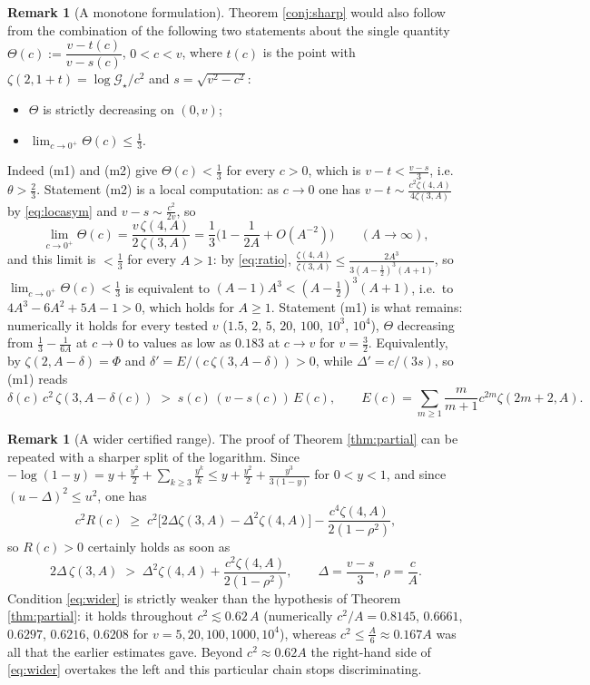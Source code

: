 \documentclass[11pt,a4paper]{amsart}
\theoremstyle{definition}
\newtheorem{remark}[theorem]{Remark}
\newcommand{\Gs}{\mathcal{G}_{\star}}
\begin{document}
\begin{remark}[A monotone formulation]\label{rem:monotone}
Theorem \ref{conj:sharp} would also follow from the combination of the following two
statements about the
single quantity $\Theta(c):=\dfrac{v-t(c)}{v-s(c)}$, $0<c<v$, where $t(c)$ is the point
with $\zeta(2,1+t)=\log\Gs/c^{2}$ and $s=\sqrt{v^{2}-c^{2}}$:
\begin{itemize}
\item[(m1)] $\Theta$ is strictly decreasing on $(0,v)$;
\item[(m2)] $\lim_{c\to0^{+}}\Theta(c)\le\frac13$.
\end{itemize}
Indeed (m1) and (m2) give $\Theta(c)<\frac13$ for every $c>0$, which is
$v-t<\frac{v-s}{3}$, i.e.\ $\theta>\frac23$. Statement (m2) is a local computation: as
$c\to0$ one has $v-t\sim\frac{c^{2}\zeta(4,A)}{4\zeta(3,A)}$ by \eqref{eq:locasym} and
$v-s\sim\frac{c^{2}}{2v}$, so
\[
  \lim_{c\to0^{+}}\Theta(c)=\frac{v\,\zeta(4,A)}{2\,\zeta(3,A)}
   =\frac13\Big(1-\frac{1}{2A}+O(A^{-2})\Big)\qquad(A\to\infty),
\]
and this limit is $<\frac13$ for every $A>1$: by \eqref{eq:ratio},
$\frac{\zeta(4,A)}{\zeta(3,A)}\le\frac{2A^{3}}{3(A-\frac12)^{3}(A+1)}$, so
$\lim_{c\to0^{+}}\Theta(c)<\frac13$ is equivalent to $(A-1)A^{3}<(A-\frac12)^{3}(A+1)$,
i.e.\ to $4A^{3}-6A^{2}+5A-1>0$, which holds for $A\ge1$. Statement
(m1) is what remains: numerically it holds for every tested $v$ ($1.5$, $2$, $5$, $20$,
$100$, $10^{3}$, $10^{4}$), $\Theta$ decreasing from $\frac13-\frac{1}{6A}$ at $c\to0$ to
values as low as $0.183$ at $c\to v$ for $v=\frac32$. Equivalently, by
$\zeta(2,A-\delta)=\Phi$ and $\delta'=E/(c\,\zeta(3,A-\delta))>0$, while
$\Delta'=c/(3s)$, so (m1) reads
\begin{equation}\label{eq:monotone}
  \delta(c)\,c^{2}\,\zeta(3,A-\delta(c))\;>\;s(c)\,(v-s(c))\,E(c),
  \qquad E(c)=\sum_{m\ge1}\frac{m}{m+1}c^{2m}\zeta(2m+2,A).
\end{equation}
\end{remark}

\begin{remark}[A wider certified range]\label{rem:wider}
The proof of Theorem \ref{thm:partial} can be repeated with a sharper split of the
logarithm. Since $-\log(1-y)=y+\frac{y^{2}}{2}+\sum_{k\ge3}\frac{y^{k}}{k}
\le y+\frac{y^{2}}{2}+\frac{y^{3}}{3(1-y)}$ for $0<y<1$, and since
$(u-\Delta)^{2}\le u^{2}$, one has
\[
  c^{2}R(c)\;\ge\;c^{2}\big[2\Delta\zeta(3,A)-\Delta^{2}\zeta(4,A)\big]
   -\frac{c^{4}\zeta(4,A)}{2(1-\rho^{2})} ,
\]
so $R(c)>0$ certainly holds as soon as
\begin{equation}\label{eq:wider}
  2\Delta\,\zeta(3,A)\;>\;\Delta^{2}\zeta(4,A)+\frac{c^{2}\zeta(4,A)}{2(1-\rho^{2})},
  \qquad \Delta=\frac{v-s}{3},\ \rho=\frac{c}{A}.
\end{equation}
Condition \eqref{eq:wider} is strictly weaker than the hypothesis of
Theorem \ref{thm:partial}: it holds throughout
$c^{2}\lesssim0.62\,A$ (numerically $c^{2}/A=0.8145$, $0.6661$, $0.6297$, $0.6216$,
$0.6208$ for $v=5,20,100,1000,10^{4}$), whereas $c^{2}\le\frac A6\approx0.167A$ was
all that the earlier estimates gave. Beyond $c^{2}\approx0.62A$ the right-hand side of
\eqref{eq:wider} overtakes the left and this particular chain stops discriminating.
\end{remark}
\end{document}
